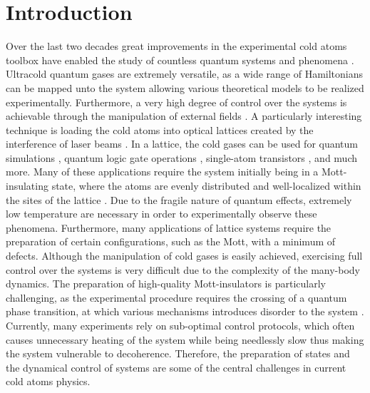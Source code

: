 \chapter{Introduction}
Over the last two decades great improvements in the experimental cold atoms toolbox have enabled the study of countless quantum systems and phenomena \cite{manybodyBloch,Bloch2012}. Ultracold quantum gases are extremely versatile, as a wide range of Hamiltonians can be mapped unto the system allowing various theoretical models to be realized experimentally. Furthermore, a very high degree of control over the systems is achievable through the manipulation of external fields \cite{JakschZoller}.
A particularly interesting technique is loading the cold atoms into optical lattices created by the interference of laser beams \cite{grimm}. In a lattice, the cold gases can be used for quantum simulations \cite{Jane2003,Jaksch2003}, quantum logic gate operations \cite{Zoller1999,Mandel2003,Jaksch2000}, single-atom transistors \cite{Micheli2004}, and much more. Many of these applications require the system initially being in a Mott-insulating state, where the atoms are evenly distributed and well-localized within the sites of the lattice \cite{lewenstein}.
Due to the fragile nature of quantum effects, extremely low temperature are necessary in order to experimentally observe these phenomena. Furthermore, many applications of lattice systems require the preparation of certain configurations, such as the Mott, with a minimum of defects. Although the manipulation of cold gases is easily achieved, exercising full control over the systems is very difficult due to the complexity of the many-body dynamics. The preparation of high-quality Mott-insulators is particularly challenging, as the experimental procedure requires the crossing of a quantum phase transition, at which various mechanisms introduces disorder to the system \cite{Zurek2005,Braun2015}. Currently, many experiments rely on sub-optimal control protocols, which often causes unnecessary heating of the system while being needlessly slow thus making the system vulnerable to decoherence.
Therefore, the preparation of states and the dynamical control of systems are some of the central challenges in current cold atoms physics.

